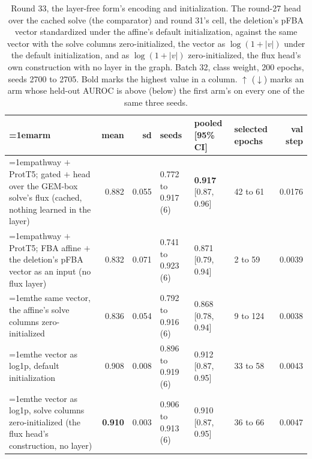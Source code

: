 \begin{table}[H]
  \centering
  \scriptsize
  \setlength{\tabcolsep}{2.5pt}
  \caption[Round 33, the layer-free form's encoding and initialization]{Round 33, the layer-free form's encoding and initialization. The round-27 head over the cached solve (the comparator) and round 31's cell, the deletion's pFBA vector standardized under the affine's default initialization, against the same vector with the solve columns zero-initialized, the vector as $\log(1 + |v|)$ under the default initialization, and as $\log(1 + |v|)$ zero-initialized, the flux head's own construction with no layer in the graph. Batch 32, class weight, 200 epochs, seeds 2700 to 2705. Bold marks the highest value in a column. $\uparrow$ ($\downarrow$) marks an arm whose held-out AUROC is above (below) the first arm's on every one of the same three seeds.}
  \label{tab:w49}
  \begin{tabular}{@{}>{\raggedright\hangindent=1em\hangafter=1\arraybackslash}p{84.4mm}rrlllr@{}}
    \hline
    arm & mean & sd & seeds & pooled [95\% CI] & selected epochs & val step \\
    \hline
    pathway $+$ ProtT5; gated $+$ head over the GEM-box solve's flux (cached, nothing learned in the layer) & 0.882 & 0.055 & 0.772 to 0.917 (6) & \textbf{0.917} [0.87, 0.96] & 42 to 61 & 0.0176 \\
    pathway $+$ ProtT5; FBA affine $+$ the deletion's pFBA vector as an input (no flux layer) & 0.832 & 0.071 & 0.741 to 0.923 (6) & 0.871 [0.79, 0.94] & 2 to 59 & 0.0039 \\
    the same vector, the affine's solve columns zero-initialized & 0.836 & 0.054 & 0.792 to 0.916 (6) & 0.868 [0.78, 0.94] & 9 to 124 & 0.0038 \\
    the vector as log1p, default initialization & 0.908 & 0.008 & 0.896 to 0.919 (6) & 0.912 [0.87, 0.95] & 33 to 58 & 0.0043 \\
    the vector as log1p, solve columns zero-initialized (the flux head's construction, no layer) & \textbf{0.910} & 0.003 & 0.906 to 0.913 (6) & 0.910 [0.87, 0.95] & 36 to 66 & 0.0047 \\
    \hline
  \end{tabular}
\end{table}
